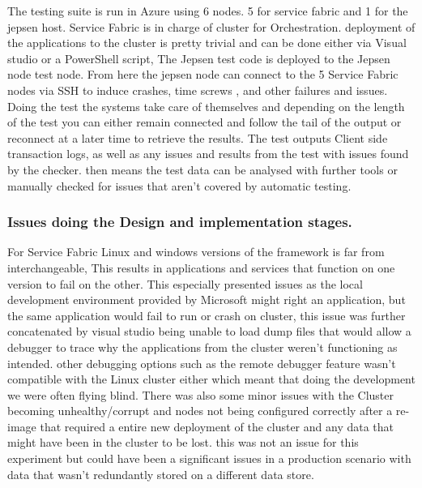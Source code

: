 \documentclass[a4paper,10pt,titlepage]{report}
\begin{document}
The testing suite is run in Azure using 6 nodes. 5 for service fabric and 1 for the jepsen host. Service Fabric is in charge of cluster for Orchestration. deployment of the applications to the cluster is pretty trivial and can be done either via Visual studio or a PowerShell script, The Jepsen test code is deployed to the Jepsen node test node. From here the jepsen node can connect to the 5 Service Fabric nodes via SSH to induce crashes, time screws , and other failures and issues.  Doing the test the systems take care of themselves and depending on the length of the test you can either remain connected and follow the tail of the output or reconnect at a later time to retrieve the results. The test outputs Client side transaction logs, as well as any issues and results from the test with issues found by the checker. then means the test data can be analysed with further tools or manually checked for issues that aren't covered by automatic testing.



\subsubsection{Issues doing the Design and implementation stages.}

For Service Fabric Linux and windows versions of the framework is far from interchangeable, This results in applications and services that function on one version to fail on the other. This especially presented issues as the local development environment provided by Microsoft might right an application, but the same application would fail to run or crash on cluster, this issue was further concatenated by visual studio being unable to load dump files that would allow a debugger to trace why the applications from the cluster weren't functioning as intended. other debugging options such as the remote debugger feature wasn't compatible with the Linux cluster either which meant that doing the development we were often flying blind. There was also some minor issues with the Cluster becoming unhealthy/corrupt and nodes not being configured correctly after a re-image that required a entire new deployment of the cluster and any data that might have been in the cluster to be lost. this was not an issue for this experiment but could have been a significant issues in a production scenario with data that wasn't redundantly stored on a different data store.
\end{document}
